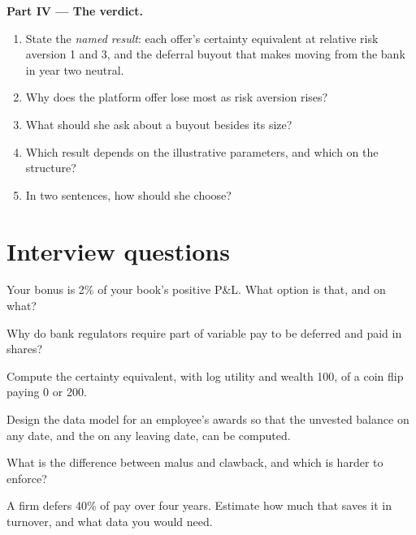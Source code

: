 \begin{problem}
\medskip\noindent\textbf{Part IV --- The verdict.}
\begin{enumerate}[resume]
\item State the \emph{named result}: each offer's certainty equivalent at relative risk aversion 1 and 3, and the
deferral buyout that makes moving from the bank in year two neutral.
\item Why does the platform offer lose most as risk aversion rises?
\item What should she ask about a buyout besides its size?
\item Which result depends on the illustrative parameters, and which on the structure?
\item In two sentences, how should she choose?
\end{enumerate}
\end{problem}

\section{Interview questions}

\begin{interviewq}\label{iq:in:how-pay-works:1}
Your bonus is 2\% of your book's positive P\&L. What option is that, and on what?
\end{interviewq}

\begin{interviewq}\label{iq:in:how-pay-works:2}
Why do bank regulators require part of variable pay to be deferred and paid in shares?
\end{interviewq}

\begin{interviewq}\label{iq:in:how-pay-works:3}
Compute the certainty equivalent, with log utility and wealth 100, of a coin flip paying 0 or 200.
\end{interviewq}

\begin{interviewq}\label{iq:in:how-pay-works:4}
Design the data model for an employee's awards so that the unvested balance on any date, and the  on any
leaving date, can be computed.
\end{interviewq}

\begin{interviewq}\label{iq:in:how-pay-works:5}
What is the difference between malus and clawback, and which is harder to enforce?
\end{interviewq}

\begin{interviewq}\label{iq:in:how-pay-works:6}
A firm defers 40\% of pay over four years. Estimate how much that saves it in turnover, and what data you would need.
\end{interviewq}
